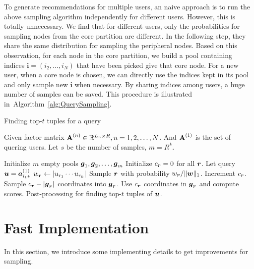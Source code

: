 \documentclass[letterpaper]{article}
\newcommand{\V}[1]{{\boldsymbol{{\MakeLowercase{#1}}}}}
\newcommand{\VnC}[3]{\V{#1}^{(#2)}_{#3}}
\newcommand{\M}[1]{{\textbf{{\MakeUppercase{#1}}}}}
\newcommand{\norm}[2]{\|#1\|_{#2}}
\newcommand{\Alg}[1] {Algorithm~\ref{alg:#1}}
\begin{document}
To generate recommendations for multiple users, an naive approach is to run the above sampling algorithm independently for different users. However, this is totally unnecessary. We find that for different users, only the probabilities for sampling nodes from the core partition are different. In the following step, they share the same distribution for sampling the peripheral nodes. Based on this observation, for each node in the core partition, we build a pool containing indices $\boldsymbol{i}=(i_2,\ldots,i_N)$ that have been picked give that core node. For a new user, when a core node is chosen, we can directly use the indices kept in its pool and only sample new $\boldsymbol{i}$ when necessary. By sharing indices among users, a huge number of samples can be saved. This procedure is illustrated in~\Alg{QuerySampling}.

\begin{algorithm}[ht]
    \caption{Finding top-$t$ tuples for a query}
    \label{alg:QuerySampling}
        Given factor matrix $\M{A}^{(n)}\in \mathbb{R}^{L_n\times R}, n = 1,2,\ldots,N$.
        And $\M{A}^{(1)}$ is the set of quering users.
        Let $s$ be the number of samples, $m=R^k$.
    \begin{algorithmic}[1]
    \State Initialize $m$ empty pools $\V{g}_1,\V{g}_2,\ldots,\V{g}_m$
    \State Initialize $c_{\V{r}} = 0$ for all $\V{r}$.
    \State Let query $\V{u}=\VnC{a}{1}{i_1*}$
    \ForAll{$\V{r}$}
    \State $w_\V{r} \leftarrow |u_{r_1}\cdots u_{r_k}|$
    \EndFor
    \State Sample $\V{r}$ with probability $w_\V{r}/\norm{\V{W}}{1}$.
    \label{line:Indexes}
    \State  Increment $c_{\V{r}}$.
    \EndFor
    \ForAll {$\V{r}$}
    \If {$c_\V{r} > |\V{g}_\V{r}|$ }
    \State Sample $c_{\V{r}} - |\V{g}_{\V{r}}|$ coordinates into $\V{g}_{\V{r}}$.
    \EndIf
    \State Use $c_{\V{r}}$ coordinates in $\V{g}_{\V{r}}$ and compute scores.
    \EndFor
    \State Post-processing for finding top-$t$ tuples of $\V{u}$.
    \EndFor
    \end{algorithmic}
\end{algorithm}

\section{Fast Implementation}
In this section, we introduce some implementing details to get improvements for sampling.
\end{document}

